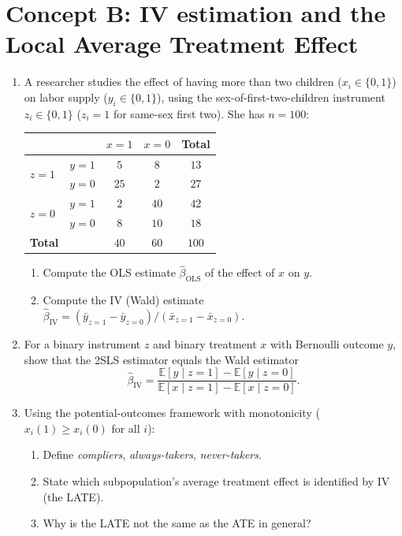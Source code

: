 \documentclass{article}
\newcommand{\E}{\mathbb{E}}
\begin{document}
\bigskip

\section*{Concept B: IV estimation and the Local Average Treatment Effect}

\begin{enumerate}[label=\textbf{B.\arabic*},leftmargin=*,itemsep=10pt]

\item  A researcher studies the effect of having more than two children ($x_i \in \{0,1\}$) on labor supply ($y_i \in \{0,1\}$), using the sex-of-first-two-children instrument $z_i \in \{0, 1\}$ ($z_i = 1$ for same-sex first two).  She has $n = 100$:
\begin{center}
\begin{tabular}{llccc}
\toprule
 & & $x = 1$ & $x = 0$ & Total \\
\midrule
\multirow{2}{*}{$z = 1$} & $y = 1$ & $5$ & $8$ & $13$ \\
 & $y = 0$ & $25$ & $2$ & $27$ \\
\midrule
\multirow{2}{*}{$z = 0$} & $y = 1$ & $2$ & $40$ & $42$ \\
 & $y = 0$ & $8$ & $10$ & $18$ \\
\midrule
\textbf{Total} & & $40$ & $60$ & $100$ \\
\bottomrule
\end{tabular}
\end{center}
\begin{enumerate}[label=(\alph*)]
  \item Compute the OLS estimate $\hat\beta_{\text{OLS}}$ of the effect of $x$ on $y$.
  \item Compute the IV (Wald) estimate $\hat\beta_{\text{IV}} = (\bar y_{z=1} - \bar y_{z=0})/(\bar x_{z=1} - \bar x_{z=0})$.
\end{enumerate}

\item  For a binary instrument $z$ and binary treatment $x$ with Bernoulli outcome $y$, show that the 2SLS estimator equals the Wald estimator
$$\hat\beta_{\text{IV}} = \frac{\E[y \mid z=1] - \E[y\mid z=0]}{\E[x\mid z=1] - \E[x\mid z=0]}.$$

\item  Using the potential-outcomes framework with monotonicity ($x_i(1) \geq x_i(0)$ for all $i$):
\begin{enumerate}[label=(\alph*)]
  \item Define \emph{compliers}, \emph{always-takers}, \emph{never-takers}.
  \item State which subpopulation's average treatment effect is identified by IV (the LATE).
  \item Why is the LATE not the same as the ATE in general?
\end{enumerate}


\end{enumerate}
\end{document}
